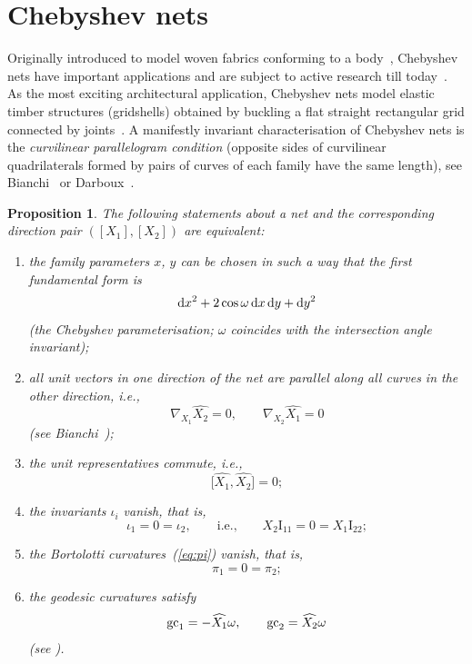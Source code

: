 \documentclass[pdftex]{sigma}
\def\I#1#2{\mathrm{I}_{#1#2}}
\def\gc#1{{\mathop{\rm gc}}_{#1}}
\def\f{\omega}
\def\eqref#1{{\rm(\ref{#1})}}
\newtheorem{Proposition}[Theorem]{Proposition}
 { \theoremstyle{definition}
\newtheorem{construction}[Theorem]{Construction}
\newtheorem{Definition}[Theorem]{Definition}
\newtheorem{Example}[Theorem]{Example}
\newtheorem{Remark}[Theorem]{Remark} }
\numberwithin{equation}{section}
\begin{document}
\section{Chebyshev nets}\label{sect:Chebyshev}

Originally introduced to model woven fabrics conforming to a
body~\cite{PLC,Ghy},
Chebyshev nets have important applications and are subject to
active research till today~\cite{AMD,H-O-O,M-M-2017,SF-C-BC-V}.
As the most exciting architectural application,
Chebyshev nets model elastic timber structures (gridshells) obtained by
buckling a flat straight rectangular grid connected by
joints~\cite{IL-2015}.
A manifestly invariant characterisation of Chebyshev nets is the
{\it curvilinear parallelogram condition} (opposite
sides of curvilinear quadrilaterals formed by pairs of curves of each family
have the same length),
see Bianchi~\cite[Section~379]{LB-II} or Darboux~\cite[Section~642]{GD-III}.

\begin{Proposition}\label{prop:Chebyshev}
The following statements about a net and the corresponding direction pair
$([X_1], [X_2])$ are equivalent\/{\rm:}
\begin{enumerate}\itemsep=0pt
\item[\rm(i)]
the family parameters $x$, $y$ can be chosen in such a way that the first
fundamental form is
\begin{gather}\label{eq:Cheb:Iff}
{\rm d} x^2 + 2 \cos\f\,{\rm d} x\,{\rm d} y + {\rm d} y^2
\end{gather}
{\rm(}the Chebyshev parameterisation\/{\rm;}
$\omega$ coincides with the intersection angle invariant\/{\rm);}
\item [\rm(ii)]
all unit vectors in one direction of the net are parallel along all curves
in the other direction, i.e.,
\[
\nabla_{X_1} \widehat{X_2} = 0, \qquad \nabla_{X_2} \widehat{X_1} = 0
\]
{\rm (}see Bianchi~{\rm\cite{LB-1922});}
\item[\rm(iii)]
the unit representatives commute, i.e.,
\[
\bigl[\widehat{X_1}, \widehat{X_2}\bigr] = 0;
\]
\item[\rm(iv)] the invariants $\iota_i$ vanish, that is,
\[
\iota_1 = 0 = \iota_2, \qquad \text{i.e.,} \qquad X_2 \I11 = 0 = X_1 \I22;
\]
\item[\rm(v)] the Bortolotti curvatures~\eqref{eq:pi} vanish, that is,
\[
\pi_1 = 0 = \pi_2;
\]
\item[\rm(vi)] the geodesic curvatures satisfy
\[
\gc{1} = -\widehat{X_1} \omega, \qquad \gc{2} = \widehat{X_2} \omega
\]
{\rm(}see {\rm\cite[equation~(4.7)]{YM-2017})}.
\end{enumerate}
\end{Proposition}
\end{document}
